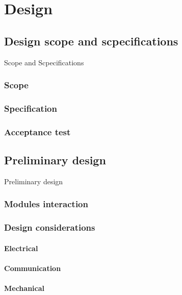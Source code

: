 \chapter{Design}


\section{Design scope and scpecifications}
Scope and Scpecifications
\subsection{Scope}
\subsection{Specification} %
\subsection{Acceptance test}


\section{Preliminary design}
Preliminary design
\subsection{Modules interaction}
\subsection{Design considerations} 
\subsubsection{Electrical}
\subsubsection{Communication}
\subsubsection{Mechanical}
